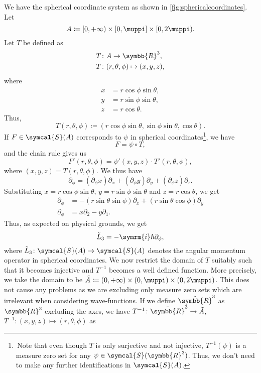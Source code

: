 \documentclass[12pt, a4 paper]{article}
\theoremstyle{definition}
\newcommand{\rthree}{\symbb{R}^3}
\newcommand{\rr}{\symbb{R}}
\newcommand{\schwartz}{\symcal{S}}
\newcommand{\schwartzrthree}{\schwartz(\rr^3)}
\renewcommand{\i}{\symrm{i}}
\renewcommand{\pi}{\muppi}
\begin{document}
    We have the spherical coordinate system as shown in \cref{fig:sphericalcoordinates}. Let
    \[
        A \coloneq [0, +\infty) \times [0,\pi] \times [0,2\pi).
    \]
    Let $T$ be defined as
    \begin{align*}
        T &\colon A \rightarrow \rthree,\\
        T &\colon (r, \theta, \phi) \mapsto (x, y, z),
    \end{align*}
    where
    \begin{align*}
        x &= r \cos{\phi} \sin{\theta},\\
        y &= r \sin{\phi} \sin{\theta},\\
        z &= r \cos{\theta}.
    \end{align*}
    Thus,
    \[
        T(r, \theta, \phi) \coloneq (r \cos{\phi} \sin{\theta}, \sin{\phi} \sin{\theta}, \cos{\theta}).
    \]
    If $F \in \schwartz(A)$ corresponds to $\psi$ in spherical coordinates\footnote{\,Note that even though $T$ is only surjective and not injective, $T^{-1}(\psi)$ is a measure zero set for any $\psi \in \schwartzrthree$. Thus, we don't need to make any further identifications in $\schwartz(A)$.}, we have
    \[
        F = \psi \circ T,
    \]
    and the chain rule gives us
    \[
        F'(r, \theta, \phi) = \psi'(x,y,z) \cdot T'(r, \theta, \phi),
    \]
    where $(x,y,z) = T(r, \theta, \phi)$. We thus have
    \[
        \partial_\phi = (\partial_\phi x)\partial_x + (\partial_\phi y)\partial_y + (\partial_\phi z)\partial_z.
    \]
    Substituting $x = r \cos{\phi} \sin{\theta}$, $y = r \sin{\phi} \sin{\theta}$ and $z = r \cos{\theta}$, we get
    \begin{align*}
        \partial_\phi &= -(r \sin{\theta} \sin{\phi})\partial_x + (r \sin{\theta} \cos{\phi})\partial_y\\
        \partial_\phi &= x\partial_2 - y\partial_1.
    \end{align*}
    Thus, as expected on physical grounds, we get
    \[
        \tilde{L}_3 = -\i\hbar\partial_\phi,
    \]
    where $\tilde{L}_3 \colon \schwartz(A) \rightarrow \schwartz(A)$ denotes the angular momentum operator in spherical coordinates.
    We now restrict the domain of $T$ suitably such that it becomes injective and $T^{-1}$ becomes a well defined function. More precisely, we take the domain to be $\tilde{A} \coloneq (0, +\infty) \times (0,\pi) \times (0,2\pi)$. This does not cause any problems as we are excluding only measure zero sets which are irrelevant when considering wave-functions. If we define $\tilde{\rr}^3$ as $\rthree$ excluding the axes, we have $T^{-1} \colon \tilde{\rr}^3 \rightarrow \tilde{A}$, $T^{-1} \colon (x, y, z) \mapsto (r, \theta, \phi)$ as
\end{document}
